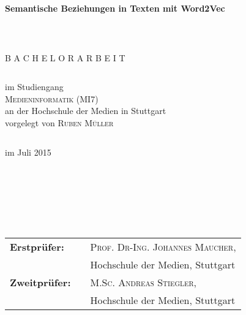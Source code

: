 \documentclass[12pt,a4paper]{report}
\begin{document}
\thispagestyle{empty}
\begin{verbatim}





\end{verbatim}
\begin{center}
\textbf{\huge{Semantische Beziehungen in Texten mit Word2Vec}}\\
\end{center}
\begin{verbatim}



\end{verbatim}
\begin{center}
\large B A C H E L O R A R B E I T

\begin{verbatim}
\end{verbatim}

\end{center}
\begin{center}
im Studiengang\\
\textsc{Medieninformatik (MI7)}\\
an der Hochschule der Medien in Stuttgart\\
vorgelegt von \textsc{Ruben Müller}\\
\begin{verbatim}
\end{verbatim}
im Juli 2015


\end{center}
\begin{verbatim}







\end{verbatim}

\begin{flushleft}
\begin{tabular}{lll}
\textbf{Erstprüfer:} & & \textsc{Prof. Dr-Ing. Johannes Maucher},\\ 
&&\small Hochschule der Medien, Stuttgart  \\
\textbf{Zweitprüfer:} & & \textsc{M.Sc. Andreas Stiegler},\\
&&\small Hochschule der Medien, Stuttgart\\
\end{tabular}
\end{flushleft}

\newpage
\end{document}
